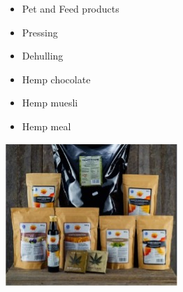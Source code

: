 \begin{minipage}{0.6\textwidth}
    \begin{itemize}
        \item Pet and Feed products
        \item Pressing
        \item Dehulling
        \item Hemp chocolate
        \item Hemp muesli
        \item Hemp meal
    \end{itemize}
    \end{minipage}%
    \hfill
    \begin{minipage}{0.35\textwidth}
        \centering
        \includegraphics[width=\linewidth]{Figures/fig_02.jpg}
        \label{fig:introduction_02}
    \end{minipage}

